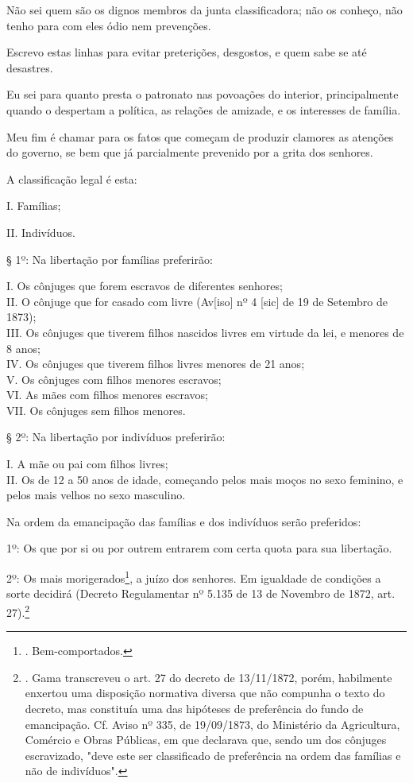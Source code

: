 Não sei quem são os dignos membros da junta classificadora; não os
conheço, não tenho para com eles ódio nem prevenções.

Escrevo estas linhas para evitar preterições, desgostos, e quem sabe se
até desastres.

Eu sei para quanto presta o patronato nas povoações do interior,
principalmente quando o despertam a política, as relações de amizade, e
os interesses de família.

Meu fim é chamar para os fatos que começam de produzir clamores as
atenções do governo, se bem que já parcialmente prevenido por a grita
dos senhores.

A classificação legal é esta:

I. Famílias;

II. Indivíduos.

§ 1º: Na libertação por famílias preferirão:

I. Os cônjuges que forem escravos de diferentes senhores;\\
II. O cônjuge que for casado com livre (Av{[}iso{]} nº 4 {[}sic{]} de 19
de Setembro de 1873);\\
III. Os cônjuges que tiverem filhos nascidos livres em virtude da lei, e
menores de 8 anos;\\
IV. Os cônjuges que tiverem filhos livres menores de 21 anos;\\
V. Os cônjuges com filhos menores escravos;\\
VI. As mães com filhos menores escravos;\\
VII. Os cônjuges sem filhos menores.

§ 2º: Na libertação por indivíduos preferirão:

I. A mãe ou pai com filhos livres;\\
II. Os de 12 a 50 anos de idade, começando pelos mais moços no sexo
feminino, e pelos mais velhos no sexo masculino.

Na ordem da emancipação das famílias e dos indivíduos serão preferidos:

1º: Os que por si ou por outrem entrarem com certa quota para sua
libertação.

2º: Os mais morigerados\footnote{. Bem-comportados.}, a juízo dos
senhores. Em igualdade de condições a sorte decidirá (Decreto
Regulamentar nº 5.135 de 13 de Novembro de 1872, art. 27).\footnote{.
  Gama transcreveu o art. 27 do decreto de 13/11/1872, porém, habilmente
  enxertou uma disposição normativa diversa que não compunha o texto do
  decreto, mas constituía uma das hipóteses de preferência do fundo de
  emancipação. Cf. Aviso nº 335, de 19/09/1873, do Ministério da
  Agricultura, Comércio e Obras Públicas, em que declarava que, sendo um
  dos cônjuges escravizado, "deve este ser classificado de preferência
  na ordem das famílias e não de indivíduos".}

